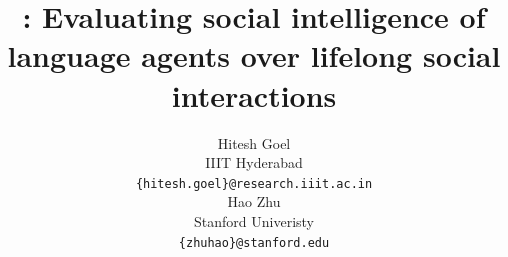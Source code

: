 \documentclass{article} %
\title{\lifelongsotopia: Evaluating social intelligence of language agents over lifelong social interactions}
\author{Hitesh Goel \\
IIIT Hyderabad\\
\texttt{\{hitesh.goel\}@research.iiit.ac.in} \\
\And
Hao Zhu \\
Stanford Univeristy \\
\texttt{\{zhuhao\}@stanford.edu} \\
}
\begin{document}
\maketitle

\begin{abstract}

\end{abstract}















\clearpage





\end{document}
